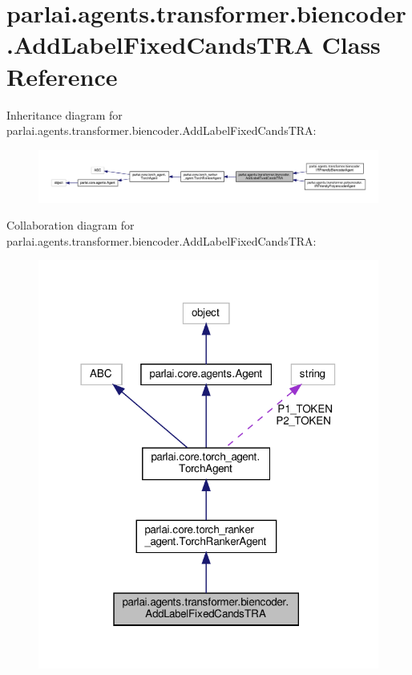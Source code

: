 \hypertarget{classparlai_1_1agents_1_1transformer_1_1biencoder_1_1AddLabelFixedCandsTRA}{}\section{parlai.\+agents.\+transformer.\+biencoder.\+Add\+Label\+Fixed\+Cands\+T\+RA Class Reference}
\label{classparlai_1_1agents_1_1transformer_1_1biencoder_1_1AddLabelFixedCandsTRA}


Inheritance diagram for parlai.\+agents.\+transformer.\+biencoder.\+Add\+Label\+Fixed\+Cands\+T\+RA\+:
\nopagebreak
\begin{figure}[H]
\begin{center}
\leavevmode
\includegraphics[width=350pt]{classparlai_1_1agents_1_1transformer_1_1biencoder_1_1AddLabelFixedCandsTRA__inherit__graph}
\end{center}
\end{figure}


Collaboration diagram for parlai.\+agents.\+transformer.\+biencoder.\+Add\+Label\+Fixed\+Cands\+T\+RA\+:
\nopagebreak
\begin{figure}[H]
\begin{center}
\leavevmode
\includegraphics[width=318pt]{classparlai_1_1agents_1_1transformer_1_1biencoder_1_1AddLabelFixedCandsTRA__coll__graph}
\end{center}
\end{figure}
